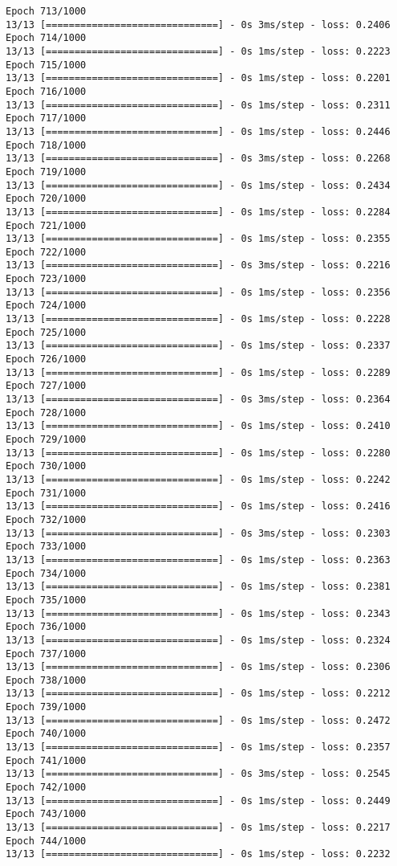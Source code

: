 \documentclass[11pt]{article}
\begin{document}
\begin{Verbatim}[commandchars=\\\{\}]
Epoch 713/1000
13/13 [==============================] - 0s 3ms/step - loss: 0.2406
Epoch 714/1000
13/13 [==============================] - 0s 1ms/step - loss: 0.2223
Epoch 715/1000
13/13 [==============================] - 0s 1ms/step - loss: 0.2201
Epoch 716/1000
13/13 [==============================] - 0s 1ms/step - loss: 0.2311
Epoch 717/1000
13/13 [==============================] - 0s 1ms/step - loss: 0.2446
Epoch 718/1000
13/13 [==============================] - 0s 3ms/step - loss: 0.2268
Epoch 719/1000
13/13 [==============================] - 0s 1ms/step - loss: 0.2434
Epoch 720/1000
13/13 [==============================] - 0s 1ms/step - loss: 0.2284
Epoch 721/1000
13/13 [==============================] - 0s 1ms/step - loss: 0.2355
Epoch 722/1000
13/13 [==============================] - 0s 3ms/step - loss: 0.2216
Epoch 723/1000
13/13 [==============================] - 0s 1ms/step - loss: 0.2356
Epoch 724/1000
13/13 [==============================] - 0s 1ms/step - loss: 0.2228
Epoch 725/1000
13/13 [==============================] - 0s 1ms/step - loss: 0.2337
Epoch 726/1000
13/13 [==============================] - 0s 1ms/step - loss: 0.2289
Epoch 727/1000
13/13 [==============================] - 0s 3ms/step - loss: 0.2364
Epoch 728/1000
13/13 [==============================] - 0s 1ms/step - loss: 0.2410
Epoch 729/1000
13/13 [==============================] - 0s 1ms/step - loss: 0.2280
Epoch 730/1000
13/13 [==============================] - 0s 1ms/step - loss: 0.2242
Epoch 731/1000
13/13 [==============================] - 0s 1ms/step - loss: 0.2416
Epoch 732/1000
13/13 [==============================] - 0s 3ms/step - loss: 0.2303
Epoch 733/1000
13/13 [==============================] - 0s 1ms/step - loss: 0.2363
Epoch 734/1000
13/13 [==============================] - 0s 1ms/step - loss: 0.2381
Epoch 735/1000
13/13 [==============================] - 0s 1ms/step - loss: 0.2343
Epoch 736/1000
13/13 [==============================] - 0s 1ms/step - loss: 0.2324
Epoch 737/1000
13/13 [==============================] - 0s 1ms/step - loss: 0.2306
Epoch 738/1000
13/13 [==============================] - 0s 1ms/step - loss: 0.2212
Epoch 739/1000
13/13 [==============================] - 0s 1ms/step - loss: 0.2472
Epoch 740/1000
13/13 [==============================] - 0s 1ms/step - loss: 0.2357
Epoch 741/1000
13/13 [==============================] - 0s 3ms/step - loss: 0.2545
Epoch 742/1000
13/13 [==============================] - 0s 1ms/step - loss: 0.2449
Epoch 743/1000
13/13 [==============================] - 0s 1ms/step - loss: 0.2217
Epoch 744/1000
13/13 [==============================] - 0s 1ms/step - loss: 0.2232

\end{Verbatim}
\end{document}
